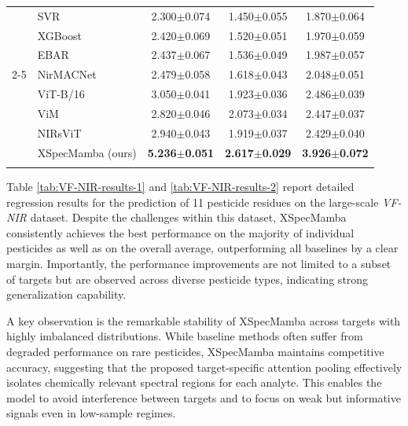 \documentclass[pdflatex,sn-mathphys-num]{sn-jnl}%
\begin{document}
\begin{table}
\begin{tabular*}{\textheight}{@{\extracolsep\fill}llccc}
& SVR
& 2.300{\scriptsize$\pm$0.074}
& 1.450{\scriptsize$\pm$0.055}
& 1.870{\scriptsize$\pm$0.064} \\

& XGBoost
& 2.420{\scriptsize$\pm$0.069}
& 1.520{\scriptsize$\pm$0.051}
& 1.970{\scriptsize$\pm$0.059} \\

& EBAR \cite{phan2025ebar}
& 2.437{\scriptsize$\pm$0.067}
& 1.536{\scriptsize$\pm$0.049}
& 1.987{\scriptsize$\pm$0.057} \\

\cmidrule(lr){2-5}

& NirMACNet \cite{phuong2025nirmacnet}
& 2.479{\scriptsize$\pm$0.058}
& 1.618{\scriptsize$\pm$0.043}
& 2.048{\scriptsize$\pm$0.051} \\

& ViT-B/16 \cite{dosovitskiy2021image}
& 3.050{\scriptsize$\pm$0.041}
& 1.923{\scriptsize$\pm$0.036}
& 2.486{\scriptsize$\pm$0.039} \\

& ViM \cite{zhu2024vision}
& 2.820{\scriptsize$\pm$0.046}
& 2.073{\scriptsize$\pm$0.034}
& 2.447{\scriptsize$\pm$0.037} \\

& NIRsViT \cite{van2024nirsvit}
& 2.940{\scriptsize$\pm$0.043}
& 1.919{\scriptsize$\pm$0.037}
& 2.429{\scriptsize$\pm$0.040} \\

& XSpecMamba (ours)
& \textbf{5.236{\scriptsize$\pm$0.051}}
& \textbf{2.617{\scriptsize$\pm$0.029}}
& \textbf{3.926{\scriptsize$\pm$0.072}} \\

\botrule
\end{tabular*}
\end{table}

Table \ref{tab:VF-NIR-results-1} and \ref{tab:VF-NIR-results-2} report detailed regression results for the prediction of 11 pesticide residues on the large-scale \textit{VF-NIR} dataset. Despite the challenges within this dataset, XSpecMamba consistently achieves the best performance on the majority of individual pesticides as well as on the overall average, outperforming all baselines by a clear margin. Importantly, the performance improvements are not limited to a subset of targets but are observed across diverse pesticide types, indicating strong generalization capability.

A key observation is the remarkable stability of XSpecMamba across targets with highly imbalanced distributions. While baseline methods often suffer from degraded performance on rare pesticides, XSpecMamba maintains competitive accuracy, suggesting that the proposed target-specific attention pooling effectively isolates chemically relevant spectral regions for each analyte. This enables the model to avoid interference between targets and to focus on weak but informative signals even in low-sample regimes.
\end{document}
